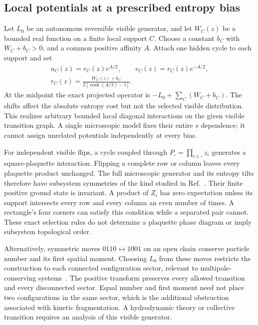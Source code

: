 \documentclass[aps,pre,reprint,amsmath,amssymb,longbibliography,floatfix]{revtex4-2}
\begin{document}
\subsection{Local potentials at a prescribed entropy bias}
Let $L_0$ be an autonomous reversible visible generator, and let $W_C(z)$
be a bounded real function on a finite local support $C$. Choose a
constant $b_C$ with $W_C+b_C>0$, and a common positive affinity $A$.
Attach one hidden cycle to each support and set
\begin{equation}
 \begin{gathered}
 u_C(z)=r_C(z)e^{A/2},\qquad v_C(z)=r_C(z)e^{-A/2},\\
 r_C(z)=\frac{W_C(z)+b_C}{2\left[\cosh(A/2)-1\right]}.
 \end{gathered}
 \label{eq:local-embedding}
\end{equation}
At the midpoint the exact projected operator is
$-L_0+\sum_C(W_C+b_C)$. The shifts affect the absolute entropy cost
but not the selected visible distribution. This realizes arbitrary
bounded local diagonal interactions on the given visible transition
graph. A single microscopic model fixes their entire $s$ dependence;
it cannot assign unrelated potentials independently at every bias.

For independent visible flips, a cycle coupled through
$P_\square=\prod_{i\in\square}z_i$ generates a square-plaquette
interaction. Flipping a complete row or column leaves every plaquette
product unchanged. The full microscopic generator and its entropy tilts
therefore have subsystem symmetries of the kind studied in
Ref.~\cite{YouDevakulBurnellSondhi2018}. Their finite positive ground
state is invariant. A product of $Z_i$ has zero expectation unless its
support intersects every row and every column an even number of times.
A rectangle's four corners can satisfy this condition while a separated
pair cannot. These exact selection rules do not determine a plaquette
phase diagram or imply subsystem topological order.

Alternatively, symmetric moves $0110\leftrightarrow1001$ on an open
chain conserve particle number and its first spatial moment. Choosing
$L_0$ from these moves restricts the construction to each connected
configuration sector, relevant to multipole-conserving
systems~\cite{HanLakeRo2024}. The positive transform preserves every
allowed transition and every disconnected sector. Equal number and
first moment need not place two configurations in the same sector,
which is the additional obstruction associated with kinetic
fragmentation. A hydrodynamic theory or collective transition requires
an analysis of this visible generator.
\end{document}
